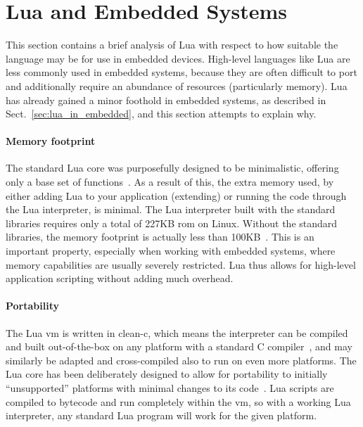\section{Lua and Embedded Systems}
\label{sec:lua_and_embedded}
This section contains a brief analysis of Lua with respect to how suitable the language may be for use in embedded devices. High-level languages like Lua are less commonly used in embedded systems, because they are often difficult to port and additionally require an abundance of resources (particularly memory). Lua has already gained a minor foothold in embedded systems, as described in Sect.~\ref{sec:lua_in_embedded}, and this section attempts to explain why.

\paragraph{Memory footprint}
The standard Lua core was purposefully designed to be minimalistic, offering only a base set of functions~\cite{article:the_implementation_of_lua}. As a result of this, the extra memory used, by either adding Lua to your application (extending) or running the code through the Lua interpreter, is minimal. The Lua interpreter built with the standard libraries requires only a total of 227KB \gls{rom} on Linux. Without the standard libraries, the memory footprint is actually less than 100KB~\cite{website:lua_about}. This is an important property, especially when working with embedded systems, where memory capabilities are usually severely restricted. Lua thus allows for high-level application scripting without adding much overhead.

\paragraph{Portability}
The Lua \gls{vm} is written in \gls{clean-c}, which means the interpreter can be compiled and built out-of-the-box on any platform with a standard C compiler~\cite{article:the_implementation_of_lua}, and may similarly be adapted and cross-compiled also to run on even more platforms. The Lua core has been deliberately designed to allow for portability to initially ``unsupported'' platforms with minimal changes to its code~\cite{chapter:porting_lua_microcontroller}. Lua scripts are compiled to bytecode and run completely within the \gls{vm}, so with a working Lua interpreter, any standard Lua program will work for the given platform.
